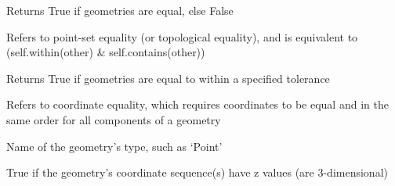 \documentclass[letterpaper,10pt,english]{sphinxmanual}
\begin{document}
\begin{fulllineitems}
\begin{fulllineitems}
\end{fulllineitems}


\begin{fulllineitems}
\label{\detokenize{reference:taipanPyRouter.ESegment.equals}}
Returns True if geometries are equal, else False

Refers to point-set equality (or topological equality), and is equivalent to
(self.within(other) \& self.contains(other))

\end{fulllineitems}


\begin{fulllineitems}
\label{\detokenize{reference:taipanPyRouter.ESegment.equals_exact}}
Returns True if geometries are equal to within a specified
tolerance

Refers to coordinate equality, which requires coordinates to be equal
and in the same order for all components of a geometry

\end{fulllineitems}


\begin{fulllineitems}
\label{\detokenize{reference:taipanPyRouter.ESegment.geom_type}}
Name of the geometry’s type, such as ‘Point’

\end{fulllineitems}


\begin{fulllineitems}
\label{\detokenize{reference:taipanPyRouter.ESegment.geometryType}}
\end{fulllineitems}


\begin{fulllineitems}
\label{\detokenize{reference:taipanPyRouter.ESegment.has_z}}
True if the geometry’s coordinate sequence(s) have z values (are
3-dimensional)


\end{fulllineitems}
\end{fulllineitems}
\end{document}

